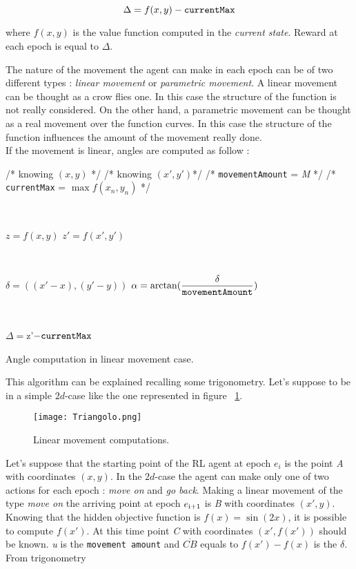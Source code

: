 \begin{itemize}
	\begin{equation}
		\Delta = f(x, y) - {\tt currentMax}
	\end{equation} 
	
	where $f(x, y)$ is the value function computed in the  \textit{current state}. Reward at each epoch is equal to $\Delta$.
	
\end{itemize}

The nature of the movement the agent can make in each epoch can be of two different types : \textit{linear movement} or \textit{parametric movement}. A linear movement can be thought as a crow flies one. In this case the structure of the function is not really considered. On the other hand, a parametric movement can be thought as a real movement over the function curves. In this case the structure of the function influences the amount of the movement really done. \\

If the movement is linear, angles are computed as follow :

\begin{algorithm}
	/* knowing $(x, y)$ */ \;
	/* knowing $(x', y')$*/ \;
	/* {\tt movementAmount} = \textit{M} */ \;
	/* {\tt currentMax} = $\max f(x_n, y_n)$ */ \;
	
	
	\
	
	$z = f(x, y)$ \;
	$z' = f(x', y')$\;
	
	\
	
	$\delta = ((x'-x),  (y'-y))$ \;
	$\alpha = \arctan(\dfrac{\delta}{\tt movementAmount})$
	 
	 \
	 
	 $\Delta = $z'$ - {\tt currentMax} $
	 
	 \caption{Angle computation in linear movement case.} 
	
\end{algorithm}

This algorithm can be explained recalling some trigonometry. Let's suppose to be in a simple $2d$-case like the one represented in figure ~\ref{fig:LMComputations}.

\begin{figure} [h!]
	\centering
	\texttt{[image: Triangolo.png]}
	\caption{Linear movement computations.}
	\label{fig:LMComputations}
\end{figure}

Let's suppose that the starting point of the RL agent at epoch $e_i$ is the point \textit{A} with coordinates $(x, y)$. In the $2d$-case the agent can make only one of two actions for each epoch : \textit{move on} and \textit{go back}. Making a linear movement of the type \textit{move on} the arriving point at epoch $e\textsubscript{i+1}$ is \textit{B} with coordinates $(x', y)$. Knowing that the hidden objective function is $f(x) = \sin(2x)$, it is possible to compute $f(x')$. At this time point \textit{C} with coordinates $(x', f(x'))$ should be known. \textit{u} is the {\tt movement amount} and $\overline{CB}$ equals to $f(x') - f(x)$ is the $\delta$. From trigonometry 

